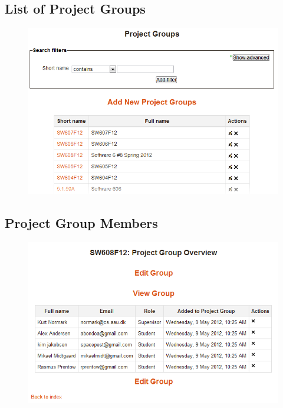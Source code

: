 \subsection{List of Project Groups}
\label{sec:preListPg}
\begin{figure}
	\centering
		\includegraphics[width=\textwidth]{images/moodleadminprojectgrouplist.png}
	\label{fig:moodleadminprojectgrouplist}
\end{figure}


\subsection{Project Group Members}
\begin{figure}
	\centering
		\includegraphics[width=\textwidth]{images/moodleprojectgroupoverview.png}
	\label{fig:moodleprojectgroupoverview}
\end{figure}


